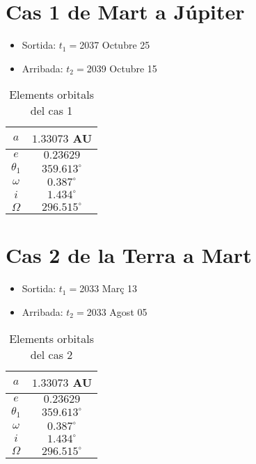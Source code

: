 \section{Cas 1 de Mart a Júpiter}
\begin{itemize}
	\item Sortida: $t_{1}=$2037 Octubre 25
	\item Arribada: $t_{2}=$2039 Octubre 15
\end{itemize}
\begin{table}[h!]
	\centering
	\begin{tabular}{ |c|c|}
		\hline
		$a$ & $1.33073$ AU \\ \hline
		$e$ & $0.23629$ \\ \hline
		$\theta_{1}$ & $359.613^{\circ}$ \\ \hline
		$\omega$ & $0.387^{\circ}$ \\ \hline
		$i$ & $1.434^{\circ}$ \\ \hline
		$\Omega$ & $296.515^{\circ}$ \\ \hline
	\end{tabular}
	\caption{Elements orbitals del cas 1}
\end{table}

\section{Cas 2 de la Terra a Mart}
\begin{itemize}
	\item Sortida: $t_{1}=$2033 Març 13
	\item Arribada: $t_{2}=$2033 Agost 05
\end{itemize}
\begin{table}[h!]
	\centering
	\begin{tabular}{ |c|c|}
		\hline
		$a$ & $1.33073$ AU \\ \hline
		$e$ & $0.23629$ \\ \hline
		$\theta_{1}$ & $359.613^{\circ}$ \\ \hline
		$\omega$ & $0.387^{\circ}$ \\ \hline
		$i$ & $1.434^{\circ}$ \\ \hline
		$\Omega$ & $296.515^{\circ}$ \\ \hline
	\end{tabular}
	\caption{Elements orbitals del cas 2}
\end{table}

